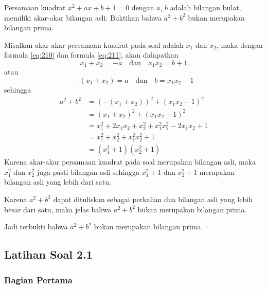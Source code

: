 	\begin{contoh}[OSN 2004 P6]
		Persamaan kuadrat $ x^{2} + ax + b + 1 = 0 $ dengan $ a $, $ b $ adalah bilangan bulat, memiliki akar-akar bilangan asli. Buktikan bahwa $ a^{2} + b^{2} $ bukan merupakan bilangan prima.
	\end{contoh}
	\begin{jawab}
		Misalkan akar-akar persamaan kuadrat pada soal adalah $ x_{1} $ dan $ x_{2} $, maka dengan formula \ref{eq:210} dan formula \ref{eq:211}, akan didapatkan
		$$ x_{1} + x_{2} = -a \quad \mbox{dan} \quad x_{1}x_{2} = b + 1 $$
		atau
		$$ -\left(x_{1} + x_{2}\right) = a \quad \mbox{dan} \quad b = x_{1}x_{2} - 1 $$
		sehingga
		\begin{align*}
			a^{2} + b^{2} &= \left(-\left(x_{1} + x_{2}\right)\right)^{2} + \left(x_{1}x_{2} - 1\right)^{2} \\
			&= \left(x_{1} + x_{2}\right)^{2} + \left(x_{1}x_{2} - 1\right)^{2} \\
			&= x_{1}^{2} + 2x_{1}x_{2} + x_{2}^{2} + x_{1}^{2}x_{2}^{2} - 2x_{1}x_{2} + 1 \\
			&= x_{1}^{2} + x_{2}^{2} + x_{1}^{2}x_{2}^{2} + 1 \\
			&= \left(x_{1}^{2} + 1\right)\left(x_{2}^{2} + 1\right)
		\end{align*}
		Karena akar-akar persamaan kuadrat pada soal merupakan bilangan asli, maka $ x_{1}^{2} $ dan $ x_{2}^{2} $ juga pasti bilangan asli sehingga $ x_{1}^{2} + 1 $ dan $ x_{2}^{2} + 1 $ merupakan bilangan asli yang lebih dari satu.
		\par \noindent Karena $ a^{2} + b^{2} $ dapat dituliskan sebagai perkalian dua bilangan asli yang lebih besar dari satu, maka jelas bahwa $ a^{2} + b^{2} $ bukan merupakan bilangan prima.
		\par \noindent Jadi terbukti bahwa $ a^{2} + b^{2} $ bukan merupakan bilangan prima. \hfill $ \square $
	\end{jawab}

\newpage

\subsection{Latihan Soal 2.1}
	
	\subsubsection{Bagian Pertama}
		
